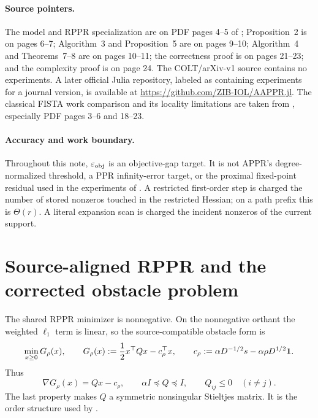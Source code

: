 \documentclass[11pt]{article}
\begin{document}
\paragraph{Source pointers.}
The model and RPPR specialization are on PDF pages 4--5 of
\citet{martinezrubio2023}; Proposition~2 is on pages 6--7; Algorithm~3 and
Proposition~5 are on pages 9--10; Algorithm~4 and Theorems~7--8 are on pages
10--11; the correctness proof is on pages 21--23; and the complexity proof is
on page 24.  The COLT/arXiv-v1 source contains no experiments.  A later
official Julia repository, labeled as containing experiments for a journal
version, is available at
\url{https://github.com/ZIB-IOL/AAPPR.jl}.  The classical FISTA work comparison
and its locality limitations are taken from
\citet{fountoulakis2026}, especially PDF pages 3--6 and 18--23.

\paragraph{Accuracy and work boundary.}
Throughout this note, $\varepsilon_{\rm obj}$ is an objective-gap target.  It
is not APPR's degree-normalized threshold, a PPR infinity-error target, or the
proximal fixed-point residual used in the experiments of
\citet{fountoulakis2026}.  A restricted first-order step is charged the
number of stored nonzeros touched in the restricted Hessian; on a path prefix
this is $\Theta(r)$.  A literal expansion scan is charged the incident
nonzeros of the current support.

\section{Source-aligned RPPR and the corrected obstacle problem}
\label{sec:model}



The shared RPPR minimizer is nonnegative.  On the nonnegative orthant the
weighted $\ell_1$ term is linear, so the source-compatible obstacle form is
\begin{equation}
 \min_{x\geq0}G_\rho(x),
 \qquad
 G_\rho(x)
 :=\frac12x^\top Qx-c_\rho^\top x,
 \qquad
 c_\rho:=\alpha D^{-1/2}s-\alpha\rho D^{1/2}\mathbf{1}.
 \label{eq:obstacle}
\end{equation}
Thus
\begin{equation}
 \nabla G_\rho(x)=Qx-c_\rho,
 \qquad
 \alpha I\preceq Q\preceq I,
 \qquad
 Q_{ij}\leq0\quad(i\neq j).
 \label{eq:obstacle-properties}
\end{equation}
The last property makes $Q$ a symmetric nonsingular Stieltjes matrix.  It is
the order structure used by \ASPR{}.
\end{document}
